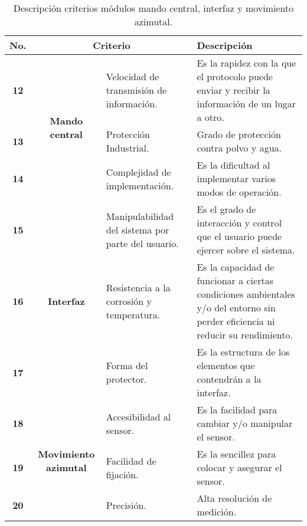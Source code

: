 \begin{table}[H]
	\centering
	\small
	\caption{Descripción criterios módulos mando central, interfaz y movimiento azimutal.}
	\begin{tabular}{|c|c|p{10em}|p{21em}|}
		\hline
		\multicolumn{1}{|p{1.715em}|}{\textbf{\footnotesize No.}} & \multicolumn{2}{p{9em}|}{\textbf{ Criterio}} & \textbf{ Descripción} \\
		\hline
		\hline
		\textbf{12} & \multicolumn{1}{c|}{\multirow{3}[15]{*}{\begin{sideways}\textbf{ Mando central}\end{sideways}}} &  Velocidad de transmisión de información. &  Es la rapidez con la que el protocolo puede enviar y recibir la información de un lugar a otro. \\
		\cline{1-1}\cline{3-4}    \textbf{ 13} &       &  Protección Industrial. &  Grado de protección contra polvo y agua. \\
		\cline{1-1}\cline{3-4}    \textbf{ 14} &       &  Complejidad de implementación. &  Es la dificultad al implementar varios modos de operación. \\
		\hline
		\textbf{ 15} & \multicolumn{1}{c|}{\multirow{3}[32]{*}{\begin{sideways}\textbf{ Interfaz}\end{sideways}}} &  Manipulabilidad del sistema por parte del usuario. &  Es el grado de interacción y control que el usuario puede ejercer sobre el sistema. \\
		\cline{1-1}\cline{3-4}    \textbf{ 16} &       &  Resistencia a la corrosión y temperatura. &  Es la capacidad de funcionar a ciertas condiciones ambientales y/o del entorno sin perder eficiencia ni reducir su rendimiento. \\
		\cline{1-1}\cline{3-4}    \textbf{ 17} &       &  Forma del protector. &  Es la estructura de los elementos que contendrán a la interfaz. \\
		\hline
		\textbf{ 18} & \multicolumn{1}{c|}{\multirow{9}[40]{*}{\begin{sideways}\textbf{ Movimiento azimutal}\end{sideways}}} &  Accesibilidad al sensor. &  Es la facilidad para cambiar y/o manipular el sensor. \\
		\cline{1-1}\cline{3-4}    \textbf{ 19} &       &  Facilidad de fijación. &  Es la sencillez para colocar y asegurar el sensor. \\
		\cline{1-1}\cline{3-4}    \textbf{ 20} &       &  Precisión. &  Alta resolución de medición. \\

\end{tabular}
\end{table}
